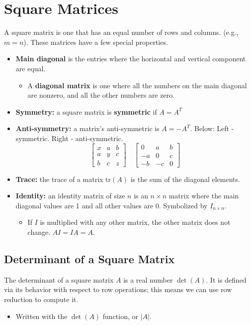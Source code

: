 \documentclass[10pt]{article}
\begin{document}
\section*{Square Matrices}
A square matrix is one that has an equal number of rows and columns.  (e.g., $m = n$).  These matrices have a few special properties.
\begin{itemize}
	\item \textbf{Main diagonal} is the entries where the horizontal and vertical component are equal.
	\begin{itemize}
	    \item A \textbf{diagonal matrix} is one where all the numbers on the main diagonal are nonzero, and all the other numbers are zero.
    \end{itemize}
	\item \textbf{Symmetry:} a square matrix is \textbf{symmetric} if $A = A^T$
	\item \textbf{Anti-symmetry:} a matrix's anti-symmetric is $A = -A^T$.  Below: Left - symmetric.  Right - anti-symmetric.
	\[\begin{bmatrix} x & a & b \\ a & y & c \\ b & c & z \end{bmatrix} \quad \begin{bmatrix} 0 & a & b \\ -a & 0 & c \\ -b & -c & 0 \end{bmatrix}\]
    \item \textbf{Trace:} the trace of a matrix $\text{tr}(A)$ is the sum of the diagonal elements.
    \item \textbf{Identity:} an identity matrix of size $n$ is an $n \times n$ matrix where the main diagonal values are 1 and all other values are 0.  Symbolized by $I_{n \times n}$.
    \begin{itemize}
	    \item If $I$ is multiplied with any other matrix, the other matrix does not change.  $AI = IA = A$.
    \end{itemize}
\end{itemize}

\subsection*{Determinant of a Square Matrix}
The determinant of a square matrix $A$ is a real number $\det(A)$.  It is defined via its behavior with respect to row operations; this means we can use row reduction to compute it.
\begin{itemize}
	\item Written with the $\det(A)$ function, or $|A|$.
\end{itemize}
\end{document}
